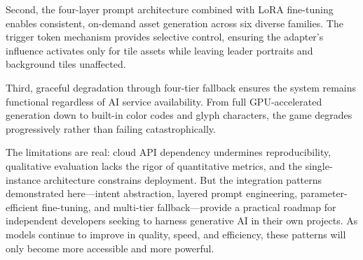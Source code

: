 \documentclass[conference]{IEEEtran}
\begin{document}
Second, the four-layer prompt architecture combined with LoRA fine-tuning
enables consistent, on-demand asset generation across six diverse families.
The trigger token mechanism provides selective control, ensuring the
adapter's influence activates only for tile assets while leaving leader
portraits and background tiles unaffected.

Third, graceful degradation through four-tier fallback ensures the system
remains functional regardless of AI service availability. From full
GPU-accelerated generation down to built-in color codes and glyph
characters, the game degrades progressively rather than failing
catastrophically.

The limitations are real: cloud API dependency undermines reproducibility,
qualitative evaluation lacks the rigor of quantitative metrics, and the
single-instance architecture constrains deployment. But the integration
patterns demonstrated here---intent abstraction, layered prompt
engineering, parameter-efficient fine-tuning, and multi-tier fallback---provide
a practical roadmap for independent developers seeking to harness
generative AI in their own projects. As models continue to improve in
quality, speed, and efficiency, these patterns will only become more
accessible and more powerful.



\end{document}
